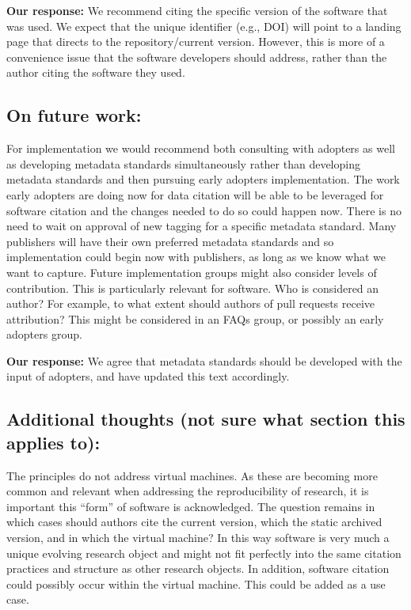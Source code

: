 \documentclass[12pt, oneside]{amsart}
\begin{document}
\textbf{Our response:} We recommend citing the specific version of the software that was used. We expect that the unique identifier (e.g., DOI) will point to a landing page that directs to the repository\slash current version. However, this is more of a convenience issue that the software developers should address, rather than the author citing the software they used.

\subsection{On future work:} For implementation we would recommend both consulting with adopters as well as developing metadata standards simultaneously rather than developing metadata standards and then pursuing early adopters implementation. The work early adopters are doing now for data citation will be able to be leveraged for software citation and the changes needed to do so could happen now. There is no need to wait on approval of new tagging for a specific metadata standard. Many publishers will have their own preferred metadata standards and so implementation could begin now with publishers, as long as we know what we want to capture. Future implementation groups might also consider levels of contribution. This is particularly relevant for software. Who is considered an author? For example, to what extent should authors of pull requests receive attribution? This might be considered in an FAQs group, or possibly an early adopters group.

\textbf{Our response:} We agree that metadata standards should be developed with the input of adopters, and have updated this text accordingly.

\subsection{Additional thoughts (not sure what section this applies to):} The principles do not address virtual machines. As these are becoming more common and relevant when addressing the reproducibility of research, it is important this ``form'' of software is acknowledged. The question remains in which cases should authors cite the current version, which the static archived version, and in which the virtual machine? In this way software is very much a unique evolving research object and might not fit perfectly into the same citation practices and structure as other research objects. In addition, software citation could possibly occur within the virtual machine. This could be added as a use case.
\end{document}
